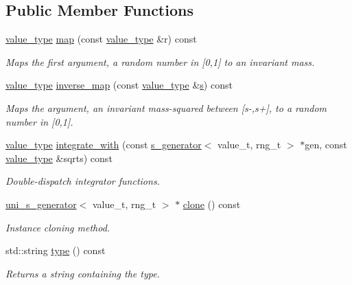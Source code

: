 \subsection*{Public Member Functions}
\begin{DoxyCompactItemize}
\item 
\hyperlink{a00362_a3353150105036deac9bde097cbf1d8af}{value\-\_\-type} \hyperlink{a00542_a48b8945b9a0ba5e96a69e0ba911dada3}{map} (const \hyperlink{a00362_a3353150105036deac9bde097cbf1d8af}{value\-\_\-type} \&r) const 
\begin{DoxyCompactList}\small\item\em Maps the first argument, a random number in \mbox{[}0,1\mbox{]} to an invariant mass. \end{DoxyCompactList}\item 
\hyperlink{a00362_a3353150105036deac9bde097cbf1d8af}{value\-\_\-type} \hyperlink{a00542_ab0e3818a5a0a138d7c3f9b86faf23355}{inverse\-\_\-map} (const \hyperlink{a00362_a3353150105036deac9bde097cbf1d8af}{value\-\_\-type} \&\hyperlink{a00482_a8bf50336c0da12a27a71eb1154a7012e}{s}) const 
\begin{DoxyCompactList}\small\item\em Maps the argument, an invariant mass-\/squared between \mbox{[}s-\/,s+\mbox{]}, to a random number in \mbox{[}0,1\mbox{]}. \end{DoxyCompactList}\item 
\hypertarget{a00542_a17be9df73d42dd17e6b5fb5431d9d699}{\hyperlink{a00362_a3353150105036deac9bde097cbf1d8af}{value\-\_\-type} \hyperlink{a00542_a17be9df73d42dd17e6b5fb5431d9d699}{integrate\-\_\-with} (const \hyperlink{a00482}{s\-\_\-generator}$<$ value\-\_\-t, rng\-\_\-t $>$ $\ast$gen, const \hyperlink{a00362_a3353150105036deac9bde097cbf1d8af}{value\-\_\-type} \&sqrts) const }\label{a00542_a17be9df73d42dd17e6b5fb5431d9d699}

\begin{DoxyCompactList}\small\item\em Double-\/dispatch integrator functions. \end{DoxyCompactList}\item 
\hyperlink{a00542}{uni\-\_\-s\-\_\-generator}$<$ value\-\_\-t, rng\-\_\-t $>$ $\ast$ \hyperlink{a00542_a30f50dbbc324c15404d4babc66a2f7f2}{clone} () const 
\begin{DoxyCompactList}\small\item\em Instance cloning method. \end{DoxyCompactList}\item 
\hypertarget{a00542_a5ab8647c174e21b895715df38dc24263}{std\-::string \hyperlink{a00542_a5ab8647c174e21b895715df38dc24263}{type} () const }\label{a00542_a5ab8647c174e21b895715df38dc24263}

\begin{DoxyCompactList}\small\item\em Returns a string containing the type. \end{DoxyCompactList}\end{DoxyCompactItemize}
